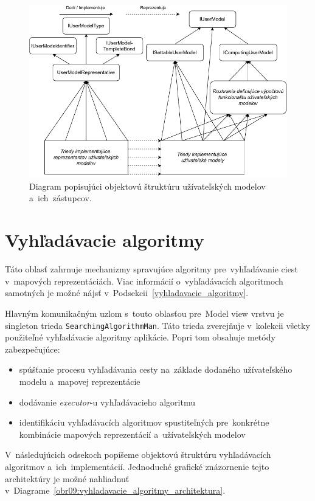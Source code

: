 \begin{figure}[h]\centering
\includegraphics[]{img/uzivatelske_modely_architektura}
\caption{Diagram popisujúci objektovú štruktúru užívateľských modelov a~ich~zástupcov.} 
\label{obr08:uzivatelske_modely_architektura}
\end{figure}

\section{Vyhľadávacie algoritmy}

Táto oblasť zahrnuje mechanizmy spravujúce algoritmy pre~vyhľadávanie ciest v~mapových reprezentáciách. Viac informácií o~vyhľadávacích algoritmoch samotných je možné nájsť v~Podsekcii~\ref{vyhladavacie_algoritmy}. 

Hlavným komunikačným uzlom s~touto oblasťou pre~Model view vrstvu je singleton trieda \texttt{SearchingAlgorithmMan}. Táto trieda zverejňuje v~kolekcii všetky použiteľné vyhľadávacie algoritmy aplikácie. Popri tom obsahuje metódy zabezpečujúce: 
\begin{itemize}
    \item spúšťanie procesu vyhľadávania cesty na~základe dodaného užívateľského modelu a~mapovej reprezentácie
    \item dodávanie \textit{executor}-u vyhľadávacieho algoritmu
    \item identifikáciu vyhľadávacích algoritmov spustiteľných pre~konkrétne kombinácie mapových reprezentácií a~užívateľských modelov 
\end{itemize}

V~následujúcich odsekoch popíšeme objektovú štruktúru vyhľadávacích algoritmov a~ich~implementácií. Jednoduché grafické znázornenie tejto architektúry je možné nahliadnuť v~Diagrame~\ref{obr09:vyhladavacie_algoritmy_architektura}.   

